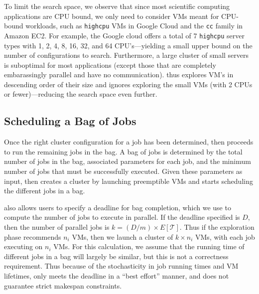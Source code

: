 
To limit the search space, we observe that since most scientific computing applications are CPU bound, we only need to consider VMs meant for CPU-bound workloads, such as \texttt{highcpu} VMs in Google Cloud and the \texttt{cc} family in Amazon EC2.
For example, the Google cloud offers a total of 7 \texttt{highcpu} server types with 1, 2, 4, 8, 16, 32, and 64 CPU's---yielding a small upper bound on the number of configurations to search. 
Furthermore, a large cluster of small servers is suboptimal for most applications (except those that are completely embarassingly parallel and have no communication).
\sysname thus explores VM's in descending order of their size and ignores exploring the small VMs (with 2 CPUs or fewer)---reducing the search space even further. 


\vspace*{\subsecspace}
\subsection{Scheduling a Bag of Jobs}


Once the right cluster configuration for a job has been determined, \sysname then proceeds to run the remaining jobs in the bag.
A bag of jobs is determined by the total number of jobs in the bag, associated parameters for each job, and the minimum number of jobs that must be successfully executed.  
Given these parameters as input, \sysname then creates a cluster by launching preemptible VMs and starts scheduling the different jobs in a bag.

\sysname also allows users to specify a deadline for bag completion, which we use to compute the number of jobs to execute in parallel.
If the deadline specified is $D$, then the number of parallel jobs is $k=(D/m)\times E[\mathcal{T}]$.
Thus if the exploration phase recommends $n_i$ VMs, then we launch a cluster of $k\times n_i$ VMs, with each job executing on $n_i$ VMs. 
For this calculation, we assume that the running time of different jobs in a bag will largely be similar, but this is not a correctness requirement.
Thus because of the stochasticity in job running times and VM lifetimes, \sysname only meets the deadline in a ``best effort'' manner, and does not guarantee strict makespan constraints. 

